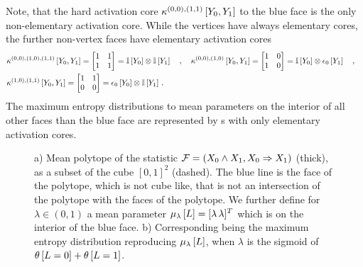 \begin{example}
    Note, that the hard activation core $\kappa^{(0,0),(1,1)}\left[Y_{0},Y_{1}\right]$ to the blue face is the only non-elementary activation core.
    While the vertices have always elementary cores, the further non-vertex faces have elementary activation cores
    \begin{align*}
        &\kappa^{(0,0),(1,0),(1,1)}\left[Y_{0},Y_{1}\right]
        = \begin{bmatrix}
              1 & 1 \\
              1 & 1
        \end{bmatrix}
        = \mathbb{I}\left[Y_{0}\right] \otimes \mathbb{I}\left[Y_{1}\right]
        \quad, \quad
        \kappa^{(0,0),(1,0)}\left[Y_{0},Y_{1}\right]
        = \begin{bmatrix}
              1 & 0 \\
              1 & 0
        \end{bmatrix}
        = \mathbb{I}\left[Y_{0}\right] \otimes \epsilon_{0}\left[Y_{1}\right]
        \quad, \quad \\
        &\kappa^{(1,0),(1,1)}\left[Y_{0},Y_{1}\right]
        = \begin{bmatrix}
              1 & 1 \\
              0 & 0
        \end{bmatrix}
        = \epsilon_{0}\left[Y_{0}\right] \otimes \mathbb{I}\left[Y_{1}\right]   \, .
    \end{align*}
    The maximum entropy distributions to mean parameters on the interior of all other faces than the blue face are represented by \ComputationActivationNetwork{}s with only elementary activation cores.

    \begin{figure}
        \begin{center}
            
        \end{center}
        \caption{
            a) Mean polytope of the statistic $\mathcal{F}=(X_{0} \land X_{1}, X_{0} \Rightarrow X_{1})$ (thick), as a subset of the cube $[0,1]^2$ (dashed).
            The blue line is the face of the polytope, which is not cube like, that is not an intersection of the polytope with the faces of the polytope.
            We further define for $\lambda\in(0,1)$ a mean parameter $\mu_{\lambda}\left[L\right] = [\lambda \,  \lambda]^T$ which is on the interior of the blue face.
            b) Corresponding \ComputationActivationNetwork{} being the maximum entropy distribution reproducing $\mu_{\lambda}\left[L\right]$, when $\lambda$ is the sigmoid of $\theta\left[L=0\right]+\theta\left[L=1\right]$.
        }\label{fig:nonelHlnstatMaxent}
    \end{figure}


\end{example}